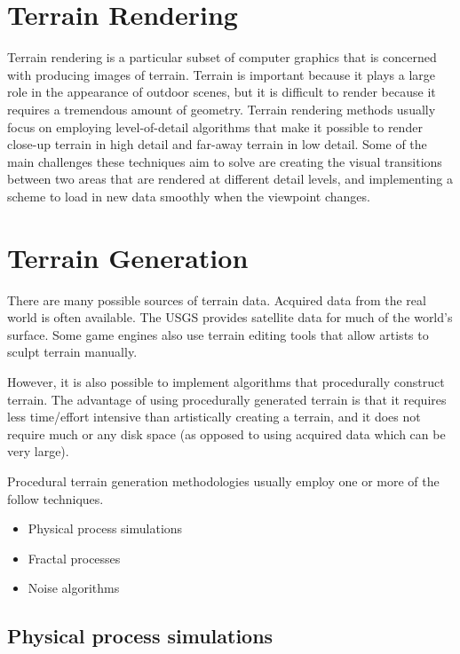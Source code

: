 \section{Terrain Rendering}

Terrain rendering is a particular subset of computer graphics that is concerned with producing images of terrain.
Terrain is important because it plays a large role in the appearance of outdoor scenes, but it is difficult to render because it requires a tremendous amount of geometry.
Terrain rendering methods usually focus on employing level-of-detail algorithms that make it possible to render close-up terrain in high detail and far-away terrain in low detail.
Some of the main challenges these techniques aim to solve are creating the visual transitions between two areas that are rendered at different detail levels, and implementing a scheme to load in new data smoothly when the viewpoint changes.

\section{Terrain Generation}

There are many possible sources of terrain data.
Acquired data from the real world is often available.
The USGS provides satellite data for much of the world's surface.
Some game engines also use terrain editing tools that allow artists to sculpt terrain manually.

However, it is also possible to implement algorithms that procedurally construct terrain.
The advantage of using procedurally generated terrain is that it requires less time/effort intensive than artistically creating a terrain, and it does not require much or any disk space (as opposed to using acquired data which can be very large).

Procedural terrain generation methodologies usually employ one or more of the follow techniques.

\begin{itemize}
\item Physical process simulations
\item Fractal processes
\item Noise algorithms
\end{itemize}

\subsection{Physical process simulations}

